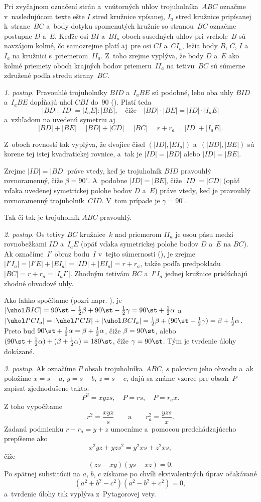 {%
Pri zvyčajnom označení strán a~vnútorných uhlov trojuholníka~$ABC$
označme v~nasledujúcom texte ešte $I$ stred kružnice vpísanej, $I_a$
stred kružnice pripísanej k~strane~$BC$ a~body dotyku spomenutých kružníc
so stranou~$BC$ označme postupne $D$ a~$E$. Keďže osi $BI$ a~$BI_a$
oboch susedných uhlov pri vrchole~$B$ sú navzájom kolmé, čo
samozrejme platí aj~pre osi $CI$ a~$CI_a$, ležia body $B$, $C$, $I$ a~$I_a$ na
kružnici s~priemerom~$II_a$. Z~toho zrejme vyplýva, že body $D$ a~$E$ ako
kolmé priemety oboch krajných bodov priemeru~$II_a$ na tetivu~$BC$ sú
súmerne združené podľa stredu strany~$BC$.

\smallskip\noindent
{\it 1. postup.}
Pravouhlé trojuholníky $BID$ a~$I_aBE$ sú podobné, lebo
oba uhly $BID$ a~$I_aBE$ dopĺňajú uhol $CBI$ do~90\st{} (\obr). Platí teda
$$
|BD|:|ID|=|I_aE|:|BE|,\quad\text{čiže}\quad
|BD| \cdot |BE| = |ID| \cdot |I_aE|
$$
a~vzhľadom na uvedenú symetriu aj
$$
|BD|+|BE|= |BD|+|CD|= |BC| = r+r_a = |ID|+|I_aE|.
$$
\removelastskip
{}%

Z~oboch rovností tak vyplýva, že dvojice čísel $(|ID|, |EI_a|)$
a~$(|BD|, |BE|)$ sú korene tej istej kvadratickej rovnice, a~tak
je $|ID|=|BD|$ alebo $|ID|=|BE|$.


Zrejme $|ID| = |BD|$ práve vtedy, keď je trojuholník $BID$ pravouhlý rovnoramenný,
čiže $\beta = 90^\circ$. A~podobne $|ID| = |BE|$, čiže $|ID| = |CD|$
(opäť vďaka uvedenej symetrickej polohe bodov $D$ a~$E$) práve vtedy, keď
je pravouhlý rovnoramenný trojuholník~$CID$. V~tom prípade je
$\gamma = 90^\circ$.

Tak či tak je trojuholník $ABC$ pravouhlý.

\smallskip\noindent
{\it 2. postup.}
Os tetivy $BC$ kružnice~$k$ nad priemerom $II_a$ je
osou pásu medzi rovnobežkami
$ID$ a~$I_aE$ (opäť vďaka symetrickej polohe bodov $D$ a~$E$ na $BC$).
Ak označíme~$I'$ obraz bodu~$I$ v~tejto súmernosti (\obr),
je zrejme $|I'I_a|=|I'E|+|EI_a|=|ID|+|EI_a|=r+r_a$, takže podľa predpokladu
$|BC| = r+r_a = |I_aI'|$. Zhodným tetivám $BC$ a~$I'I_a$ jednej kružnice
prislúchajú zhodné obvodové uhly.
%

Ako ľahko spočítame (pozri napr. ), je
$|\uhol BIC|=90\st-\frac12\beta+90\st-\frac12\gamma=90\st+\frac12\alpha$
a~$|\uhol I'CI_a|=|\uhol I'CB|+|\uhol BCI_a|=\frac12\beta+(90\st-\frac12\gamma)
=\beta+\frac12\alpha$. Preto buď $90\st+\frac12\alpha=\beta+\frac12\alpha$,
čiže $\beta=90\st$, alebo $(90\st+\frac12\alpha)+(\beta+\frac12\alpha)=180\st$,
čiže $\gamma=90\st$.
Tým je tvrdenie úlohy dokázané.

\smallskip\noindent
{\it 3. postup.}
Ak označíme $P$ obsah trojuholníka~$ABC$, $s$ polovicu jeho obvodu a~ak položíme $x=s-a$,
$y=s-b$, $z=s-c$, dajú sa známe vzorce pre obsah~$P$ zapísať
zjednodušene takto:
$$
P^2 = xyzs, \quad P= rs, \quad P= r_ax.
$$
Z toho vypočítame
$$
r^2 = \frac{xyz}{s} \qquad \text{a} \qquad r_a^2 = \frac{yzs}{x}.
$$
Zadanú podmienku $r+r_a=y+z$ umocníme a~pomocou predchádzajúceho prepíšeme ako
$$
x^2yz+yzs^2=y^2xs+z^2xs,
$$
čiže
$$
(zs-xy)(ys-xz) = 0.
$$
Po spätnej substitúcii na $a$, $b$, $c$ získame po chvíli ekvivalentných úprav
očakávané
$$
(a^2+b^2-c^2)(a^2-b^2+c^2)=0,
$$
a~tvrdenie úlohy tak vyplýva z~Pytagorovej vety.
}

